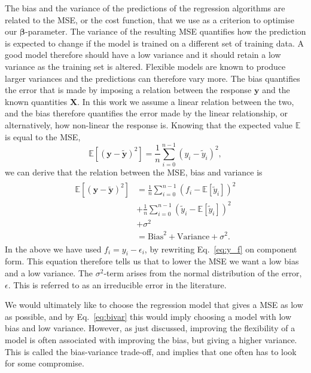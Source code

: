 \documentclass[a4paper, 
amsfonts, 
amssymb, 
amsmath, 
reprint, 
showkeys, 
nofootinbib, 
twoside]{revtex4-2}
\begin{document}
The bias and the variance of the predictions of the regression algorithms are related to the MSE, or the cost function, that we use as a criterion to optimise our $\bm{\beta}$-parameter.  
The variance of the resulting MSE quantifies how the prediction is expected to change if the model is trained on a different set of training data. A good model therefore should have a low variance and it should retain a low variance as the training set is altered. Flexible models are known to produce larger variances and the predictions can therefore vary more. 
The bias quantifies the error that is made by imposing a relation between the response $\bm{y}$ and the known quantities $\bm{X}$. In this work we assume a linear relation between the two, and the bias therefore quantifies the error made by the linear relationship,  or alternatively, how non-linear the response is.
Knowing that the expected value $\mathbb{E}$ is equal to the MSE, 
\begin{equation}
    \mathbb{E}\left[(\mathbf{y} - \mathbf{\tilde{y}})^2\right] = \frac{1}{n}\sum_{i = 0}^{n-1} (y_i - \tilde{y}_i)^2,
\end{equation}
we can derive that the relation between the MSE, bias and variance is
\begin{align}
\label{eq:bivar}
    \begin{split}
        \mathbb{E}\left[(\mathbf{y} - \mathbf{\tilde{y}})^2\right] &= \frac{1}{n}\sum_{i = 0}^{n-1} (f_i - \mathbb{E}[\tilde{y}_i])^2 \\
        &+ \frac{1}{n}\sum_{i = 0}^{n-1} (\tilde{y}_i - \mathbb{E}[\tilde{y}_i])^2 \\
        &+ \sigma^2 \\
        &= \mathrm{Bias}^2 + \mathrm{Variance} + \sigma^2.
    \end{split}
\end{align}
In the above we have used $f_i = y_i - \epsilon_i$, by rewriting Eq.~\eqref{eq:y_f} on component form. This equation therefore tells us that to lower the MSE we want a low bias and a low variance. The $\sigma^2$-term arises from the normal distribution of the error, $\epsilon$. This is referred to as an irreducible error in the literature.

We would ultimately like to choose the regression model that gives a MSE as low as possible, and by Eq.~\eqref{eq:bivar} this would imply choosing a model with low bias and low variance. However, as just discussed, improving the flexibility of a model is often associated with improving the bias, but giving a higher variance. This is called the bias-variance trade-off, and implies that one often has to look for some compromise. 
\end{document}
